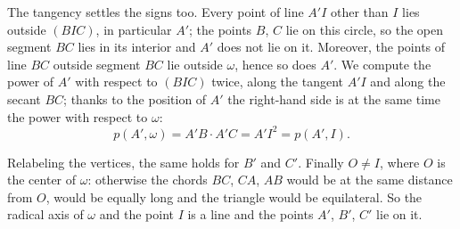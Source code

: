 {    The tangency settles the signs too. Every point of line $A'I$ other than $I$ lies outside $(BIC)$, in particular $A'$; the points $B$, $C$ lie on this circle, so the open segment $BC$ lies in its interior and $A'$ does not lie on it. Moreover, the points of line $BC$ outside segment $BC$ lie outside $\omega$, hence so does $A'$. We compute the power of $A'$ with respect to $(BIC)$ twice, along the tangent $A'I$ and along the secant $BC$; thanks to the position of $A'$ the right-hand side is at the same time the power with respect to $\omega$:
    $$
    p(A',\omega) = A'B \cdot A'C = A'I^2 = p(A',I).
    $$

    Relabeling the vertices, the same holds for $B'$ and $C'$. Finally $O \neq I$, where $O$ is the center of $\omega$: otherwise the chords $BC$, $CA$, $AB$ would be at the same distance from $O$, would be equally long and the triangle would be equilateral. So the radical axis of $\omega$ and the point $I$ is a line and the points $A'$, $B'$, $C'$ lie on it.
}

